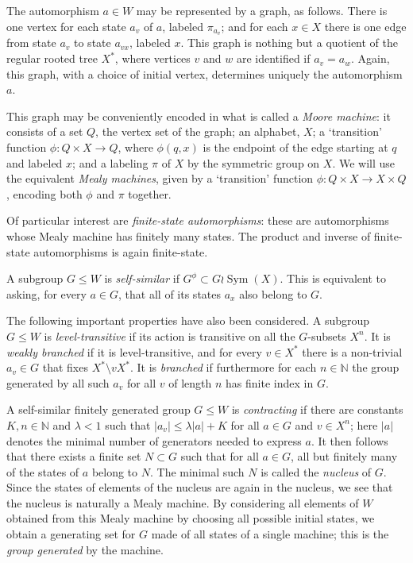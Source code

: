 \documentclass[a4paper,11pt]{report}
\begin{document}
{{ The automorphism $a \in W$ may be represented by a graph, as follows. There is one vertex for each state $a_v$ of $a$, labeled $\pi_{a_v}$; and for each $x \in X$ there is one edge from state $a_v$ to state $a_{vx}$, labeled $x$. This graph is nothing but a quotient of the regular rooted tree $X^*$, where vertices $v$ and $w$ are identified if $a_v=a_w$. Again, this graph, with a choice of initial vertex, determines uniquely the
automorphism $a$. 

 This graph may be conveniently encoded in what is called a \emph{Moore machine}: it consists of a set $Q$, the vertex set of the graph; an alphabet, $X$; a `transition' function $\phi:Q\times X\to Q$, where $\phi(q,x)$ is the endpoint of the edge starting at $q$ and labeled $x$; and a labeling $\pi$ of $X$ by the symmetric group on $X$. We will use the equivalent \emph{Mealy machines}, given by a `transition' function $\phi:Q\times X\to X\times Q$, encoding both $\phi$ and $\pi$ together. 

 Of particular interest are \emph{finite-state automorphisms}: these are automorphisms whose Mealy machine has finitely many states. The
product and inverse of finite-state automorphisms is again finite-state. 

 A subgroup $G \le W$ is \emph{self-similar} if $G^\phi \subset G\wr\mathop{Sym}(X)$. This is equivalent to asking, for every $a \in G$, that all of its states $a_x$ also belong to $G$. 

 The following important properties have also been considered. A subgroup $G \le W$ is \emph{level-transitive} if its action is transitive on all the $G$-subsets $X^n$. It is \emph{weakly branched} if it is level-transitive, and for every $v\in X^*$ there is a non-trivial $a_v\in G$ that fixes $X^* \setminus vX^*$. It is \emph{branched} if furthermore for each $n \in \mathbb N$ the group generated by all such $a_v$ for all $v$ of length $n$ has finite index in $G$. 

 A self-similar finitely generated group $G \le W$ is \emph{contracting} if there are constants $K,n \in \mathbb N$ and $\lambda<1$ such that $|a_v|\le\lambda|a|+K$ for all $a\in G$ and $v\in X^n$; here $|a|$ denotes the minimal number of generators needed to express $a$. It then follows that there exists a finite set $N\subset G$ such that for all $a\in G$, all but finitely many of the states of $a$ belong to $N$. The minimal such $N$ is called the \emph{nucleus} of $G$. Since the states of elements of the nucleus are again in the nucleus, we see
that the nucleus is naturally a Mealy machine. By considering all elements of $W$ obtained from this Mealy machine by choosing all possible initial states, we
obtain a generating set for $G$ made of all states of a single machine; this is the \emph{group generated} by the machine. 

}}
\end{document}
